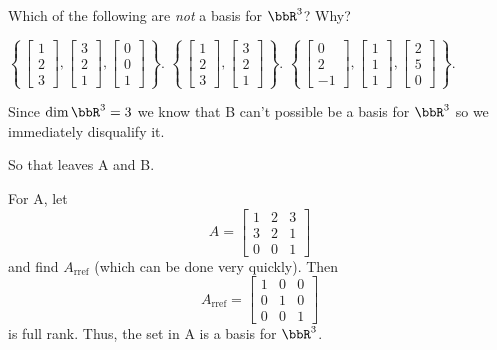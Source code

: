 \begin{questions}
  \question Which of the following are \emph{not} a basis for $\bbR^3$?
  Why?
  \begin{choices}
    \CorrectChoice
    $\displaystyle\left\{\,
      \begin{bmatrix}1\\2\\3\end{bmatrix},
      \begin{bmatrix}3\\2\\1\end{bmatrix},
      \begin{bmatrix}0\\0\\1\end{bmatrix}
      \,\right\}$.
    \choice
    $\displaystyle\left\{\,
      \begin{bmatrix}1\\2\\3\end{bmatrix},
      \begin{bmatrix}3\\2\\1\end{bmatrix}
      \,\right\}$.
    \CorrectChoice
    $\displaystyle\left\{\,
      \begin{bmatrix}0\\2\\-1\end{bmatrix},
      \begin{bmatrix}1\\1\\1\end{bmatrix},
      \begin{bmatrix}2\\5\\0\end{bmatrix}
      \,\right\}$.
  \end{choices}
  \begin{solution}
    Since $\dim\bbR^3=3$ we know that B can't possible be a basis for
    $\bbR^3$ so we immediately disqualify it.

    So that leaves A and B.

    For A, let
    \[
      A=\begin{bmatrix}%
        1&2&3\\
        3&2&1\\
        0&0&1
    \end{bmatrix}
    \]
    and find $A_{\text{rref}}$ (which can be done very quickly). Then
    \[
      A_{\text{rref}}=%
      \begin{bmatrix}%
        1&0&0\\
        0&1&0\\
        0&0&1
      \end{bmatrix}
    \]
    is full rank. Thus, the set in A is a basis for $\bbR^3$.


\end{solution}
\end{questions}
